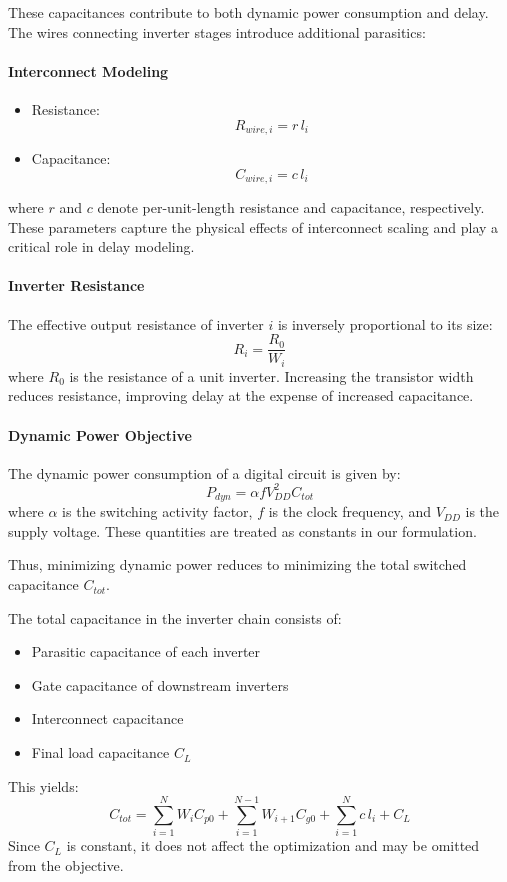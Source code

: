 \documentclass{article}
\begin{document}
These capacitances contribute to both dynamic power consumption and delay.
The wires connecting inverter stages introduce additional parasitics:
\paragraph{Interconnect Modeling}
\begin{itemize}
	\item Resistance: \[ R_{wire,i} = r\,l_i \]
	\item Capacitance: \[ C_{wire,i} = c\,l_i \]
\end{itemize}
where $r$ and $c$ denote per-unit-length resistance and capacitance, respectively.
These parameters capture the physical effects of interconnect scaling and play a
critical role in delay modeling.

\paragraph{Inverter Resistance}
The effective output resistance of inverter $i$ is inversely proportional
to its size: \[ R_i = \frac{R_0}{W_i} \] where $R_0$ is the resistance of a unit
inverter. Increasing the transistor width reduces resistance, improving delay at the
expense of increased capacitance.

\paragraph{Dynamic Power Objective}
The dynamic power consumption of a digital circuit is given by:
\[ P_{dyn} = \alpha f V_{DD}^2 C_{tot} \]
where $\alpha$ is the switching activity factor, $f$ is the clock frequency, and $V_{DD}$ is the supply voltage.
These quantities are treated as constants in our formulation.

Thus, minimizing dynamic power reduces to minimizing the total switched capacitance $C_{tot}$.

The total capacitance in the inverter chain consists of:
\begin{itemize}
	\item Parasitic capacitance of each inverter
	\item Gate capacitance of downstream inverters
	\item Interconnect capacitance
	\item Final load capacitance $C_L$
\end{itemize}

This yields:
\[ C_{tot} = \sum_{i=1}^{N} W_i C_{p0} + \sum_{i=1}^{N-1} W_{i+1} C_{g0} + \sum_{i=1}^{N} c\,l_i + C_L \]
Since $C_L$ is constant, it does not affect the optimization and may be omitted from the objective.
\end{document}
